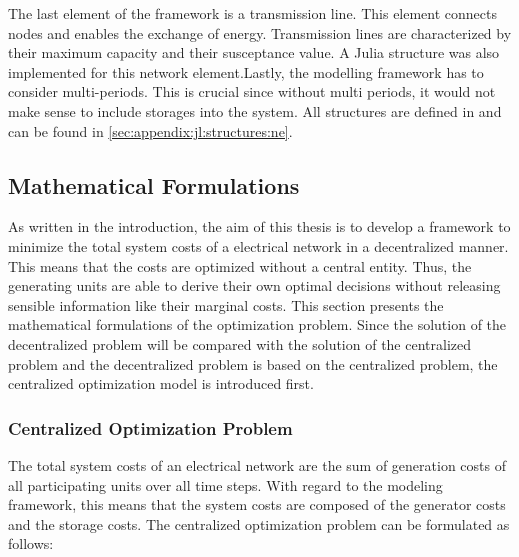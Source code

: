 The last element of the framework is a transmission line. This element connects nodes and enables the exchange of energy. Transmission lines are characterized by their maximum capacity and their susceptance value. A Julia structure was also implemented for this network element.Lastly, the modelling framework has to consider multi-periods. This is crucial since without multi periods, it would not make sense to include storages into the system. All structures are defined in  and can be found in \ref{sec:appendix:jl:structures:ne}.


\subsection{Mathematical Formulations}
\label{sec:app:math-form}

As written in the introduction, the aim of this thesis is to develop a framework to minimize the total system costs of a electrical network in a decentralized manner. This means that the costs are optimized without a central entity. Thus, the generating units are able to derive their own optimal decisions without releasing sensible information like their marginal costs. This section presents the mathematical formulations of the optimization problem. Since the solution of the decentralized problem will be compared with the solution of the centralized problem and the decentralized problem is based on the centralized problem, the centralized optimization model is introduced first.

\subsubsection{Centralized Optimization Problem}

The total system costs of an electrical network are the sum of generation costs of all participating units over all time steps. With regard to the modeling framework, this means that the system costs are composed of the generator costs and the storage costs. The centralized optimization problem can be formulated as follows:

